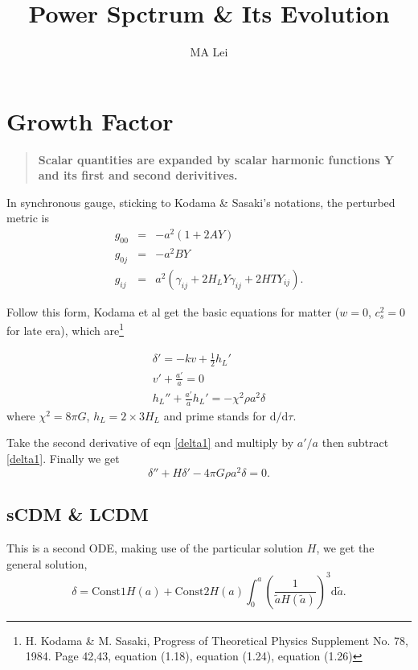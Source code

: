 \documentclass{article}
\begin{document}
\title{Power Spctrum \& Its Evolution}
\author{MA Lei}



\section{Growth Factor}

\begin{quote}
\bf {Scalar quantities are expanded by scalar harmonic functions Y and its first and second derivitives.}
\end{quote}

In synchronous gauge, sticking to Kodama \& Sasaki's notations, the perturbed metric is
\begin{eqnarray*}
g_{00}&=&-a^2(1+2AY) \\
g_{0j}&=&-a^2BY \\
g_{ij}&=&a^2(\gamma_{ij}+2H_LY\gamma_{ij}+2HTY_{ij}).
\end{eqnarray*}



Follow this form, Kodama et al get the basic equations for matter ($w=0$, $c_s^2=0$ for late era), which are\footnote{H. Kodama \& M. Sasaki, Progress of Theoretical Physics Supplement No. 78, 1984. Page 42,43, equation (1.18), equation (1.24), equation (1.26)}



\begin{eqnarray}
\delta'=-kv+\frac 1 2 h_L'  \label{delta1} \\
v'+\frac{a'}{a}=0 \label{v1} \\
h_L''+\frac{a'}{a}h_L'=-\chi^2\rho a^2 \delta \label{hL1}
\end{eqnarray}
where $\chi^2=8\pi G$, $h_L=2\times 3H_L$ and prime stands for $\mathrm d/\mathrm d\tau$.

Take the second derivative of eqn \ref{delta1} and multiply by $a'/a$ then subtract \ref{delta1}. Finally we get 
\begin{equation}
\delta''+H\delta'-4\pi G \rho a^2 \delta=0      .
\end{equation}

\subsection{sCDM \& LCDM}

This is a second ODE, making use of the particular solution $H$, we get the general solution,
\begin{equation}
\delta=\text{Const1}H(a)+\text{Const2}H(a)\int_0^a(\frac{1}{\tilde a H(\tilde a)})^3\mathrm d\tilde a      .
\end{equation}
\end{document}
